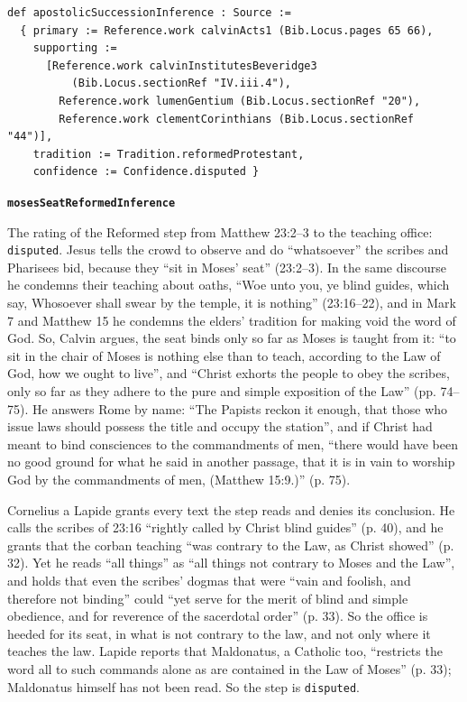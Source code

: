 \documentclass[11pt]{article}
\begin{document}
{\small\begin{verbatim}
def apostolicSuccessionInference : Source :=
  { primary := Reference.work calvinActs1 (Bib.Locus.pages 65 66),
    supporting :=
      [Reference.work calvinInstitutesBeveridge3
          (Bib.Locus.sectionRef "IV.iii.4"),
        Reference.work lumenGentium (Bib.Locus.sectionRef "20"),
        Reference.work clementCorinthians (Bib.Locus.sectionRef "44")],
    tradition := Tradition.reformedProtestant,
    confidence := Confidence.disputed }
\end{verbatim}}
\par\medskip\noindent\textbf{\texttt{moses\allowbreak{}Seat\allowbreak{}Reformed\allowbreak{}Inference}}\par\nobreak\noindent
The rating of the Reformed step from Matthew 23:2–3 to the teaching office: \texttt{disputed}. Jesus tells the crowd to observe and do “whatsoever” the scribes and Pharisees bid, because they “sit in Moses’ seat” (23:2–3). In the same discourse he condemns their teaching about oaths, “Woe unto you, ye blind guides, which say, Whosoever shall swear by the temple, it is nothing” (23:16–22), and in Mark 7 and Matthew 15 he condemns the elders’ tradition for making void the word of God. So, Calvin argues, the seat binds only so far as Moses is taught from it: “to sit in the chair of Moses is nothing else than to teach, according to the Law of God, how we ought to live”, and “Christ exhorts the people to obey the scribes, only so far as they adhere to the pure and simple exposition of the Law” (pp. 74–75). He answers Rome by name: “The Papists reckon it enough, that those who issue laws should possess the title and occupy the station”, and if Christ had meant to bind consciences to the commandments of men, “there would have been no good ground for what he said in another passage, that it is in vain to worship God by the commandments of men, (Matthew 15:9.)” (p. 75).

Cornelius a Lapide grants every text the step reads and denies its conclusion. He calls the scribes of 23:16 “rightly called by Christ blind guides” (p. 40), and he grants that the corban teaching “was contrary to the Law, as Christ showed” (p. 32). Yet he reads “all things” as “all things not contrary to Moses and the Law”, and holds that even the scribes’ dogmas that were “vain and foolish, and therefore not binding” could “yet serve for the merit of blind and simple obedience, and for reverence of the sacerdotal order” (p. 33). So the office is heeded for its seat, in what is not contrary to the law, and not only where it teaches the law. Lapide reports that Maldonatus, a Catholic too, “restricts the word all to such commands alone as are contained in the Law of Moses” (p. 33); Maldonatus himself has not been read. So the step is \texttt{disputed}.
\end{document}
